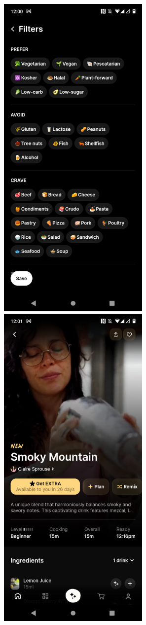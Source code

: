 \documentclass[]{project_final}
\begin{document}
\begin{figure}[ht!]
  \centering
  \begin{minipage}[t]{0.4\textwidth}
    \includegraphics[width=20em]{cremeImage3.png}
  \end{minipage}
  \hfill
  \begin{minipage}[t]{0.4\textwidth}
    \includegraphics[width=20em]{cremeImage4.png}

\end{minipage}
\end{figure}
\end{document}
